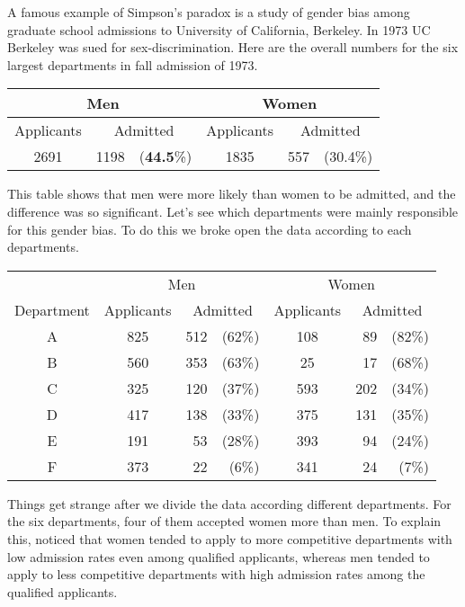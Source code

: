 \begin{example}
A famous example of Simpson's
paradox is a study of gender bias among graduate school admissions to
University of California, Berkeley. In 1973 UC Berkeley was sued for
sex-discrimination. Here are the overall numbers for the six largest
departments in fall admission of 1973.

\begin{center}
\begin{tabular}{crrcrr}\hline
 \multicolumn{3}{c}{Men} & \multicolumn{3}{c}{Women} \\\hline
 Applicants & \multicolumn{2}{c}{Admitted} & Applicants & \multicolumn{2}{c}{Admitted} \\\hline
 2691 & 1198 & ({\bf 44.5}\%) & 1835 & 557 & (30.4\%) \\\hline
\end{tabular}
\end{center}

This table shows that men were more likely than women to be admitted,
and the difference was so significant. Let's see which departments
were mainly responsible for this gender bias. To do this we broke open
the data according to each departments.

\begin{center}
\begin{tabular}{ccrrcrr}\hline
  & \multicolumn{3}{c}{Men}  & \multicolumn{3}{c}{Women} \\\cline{2-7}
Department & Applicants  & \multicolumn{2}{c}{Admitted} & Applicants  & \multicolumn{2}{c}{Admitted} \\\hline
A & 825 & 512& (62\%) & 108 & 89 &(82\%)  \\ 
B & 560 & 353& (63\%) & 25  & 17 &(68\%)  \\
C & 325 & 120& (37\%) & 593 & 202& (34\%) \\
D & 417 & 138& (33\%) & 375 & 131& (35\%) \\
E & 191 & 53 & (28\%) & 393 & 94 &(24\%)  \\
F & 373 & 22 & (6\%) & 341 & 24 &(7\%)  \\\hline
\end{tabular}
\end{center}

Things get strange after we divide the data according different
departments. For the six departments, four of them accepted women more
than men.  To explain this, \cite{bickel1975sex} noticed that women
tended to apply to more competitive departments with low admission
rates even among qualified applicants, whereas men tended to apply to
less competitive departments with high admission rates among the
qualified applicants.
\end{example}

